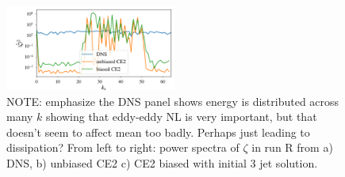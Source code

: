 \documentclass{jfm}
\begin{document}
\begin{figure}
  \centering
  \includegraphics[width=0.5\textwidth]{../../figs/kx_power_spectra_zeta_dns_run_R.pdf}
  \caption{NOTE: emphasize the DNS panel shows energy is distributed across many $k$ showing that eddy-eddy NL is very important, but that doesn't seem to affect mean too badly. Perhaps just leading to dissipation? From left to right: power spectra of $\zeta$ in run R from a) DNS, b) unbiased CE2 c) CE2 biased with initial 3 jet solution.}
  \label{fig:power_spec_S}
\end{figure}
\end{document}
